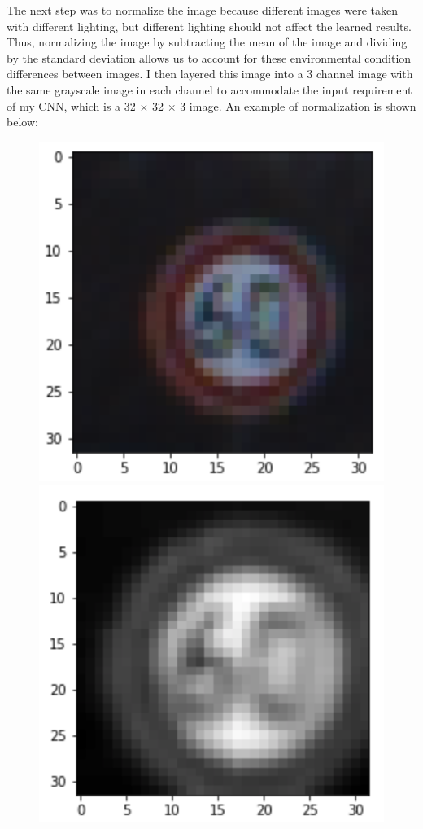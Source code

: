 \documentclass[12pt]{article}
\begin{document}
The next step was to normalize the image because different images were taken with different lighting, but different lighting should not affect the learned results. Thus, normalizing the image by subtracting the mean of the image and dividing by the standard deviation allows us to account for these environmental condition differences between images. I then layered this image into a 3 channel image with the same grayscale image in each channel to accommodate the input requirement of my CNN, which is a 32 $\times$ 32 $\times$ 3 image. An example of normalization is shown below:
\begin{figure}[!h]
\includegraphics[scale = 0.5]{writeup_images/im1.png}
\includegraphics[scale = 0.5]{writeup_images/normalized.png}
\end{figure}
\end{document}
